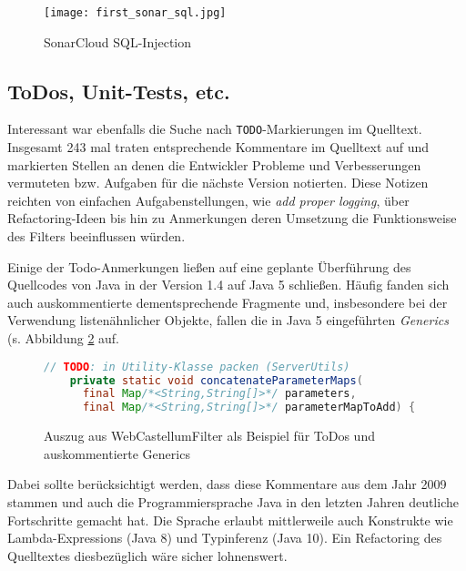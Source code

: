 \begin{figure}
    \centering
    \texttt{[image: first\_sonar\_sql.jpg]}
    \caption{SonarCloud SQL-Injection}
    \label{fig:my_sonar2}
\end{figure}



\subsection{ToDos, Unit-Tests,  etc.}

Interessant war ebenfalls die Suche nach \verb=TODO=-Markierungen im Quelltext. Insgesamt 243 mal traten entsprechende Kommentare im Quelltext auf und markierten Stellen an denen die Entwickler Probleme und Verbesserungen vermuteten bzw. Aufgaben für die nächste Version notierten. Diese Notizen reichten von einfachen Aufgabenstellungen, wie \glqq\emph{add proper logging}\grqq, über Refactoring-Ideen bis hin zu Anmerkungen deren Umsetzung die Funktionsweise des Filters beeinflussen würden. 

Einige der Todo-Anmerkungen ließen auf eine geplante Überführung des Quellcodes von Java in der Version 1.4 auf Java 5 schließen. Häufig fanden sich auch auskommentierte dementsprechende Fragmente und, insbesondere bei der Verwendung listenähnlicher Objekte, fallen die in Java 5 eingeführten \emph{Generics} (s. Abbildung \ref{fig:my_l2} auf.

\begin{figure}[h]
  \begin{small}
    \begin{lstlisting}[language=java]
    // TODO: in Utility-Klasse packen (ServerUtils)
    private static void concatenateParameterMaps(
      final Map/*<String,String[]>*/ parameters, 
      final Map/*<String,String[]>*/ parameterMapToAdd) {
    \end{lstlisting}
  \end{small}
  \caption{Auszug aus WebCastellumFilter als Beispiel für ToDos und auskommentierte Generics}
  \label{fig:my_l2}
\end{figure}
  
Dabei sollte berücksichtigt werden, dass diese Kommentare aus dem Jahr 2009 stammen und auch die Programmiersprache Java in den letzten Jahren deutliche Fortschritte gemacht hat. Die Sprache erlaubt mittlerweile auch Konstrukte wie Lambda-Expressions (Java 8) und Typinferenz (Java 10). Ein Refactoring des Quelltextes diesbezüglich wäre sicher lohnenswert.

